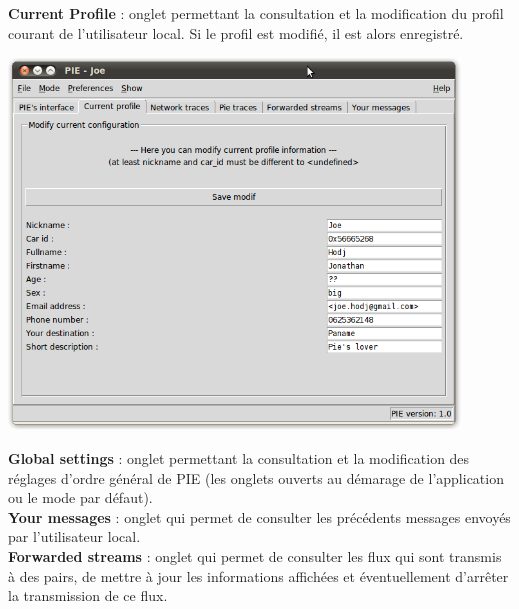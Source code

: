 \clearpage
\textbf{Current Profile} : onglet permettant la consultation et la modification du profil
courant de l'utilisateur local. Si le profil est modifié, il est alors enregistré. \\

\begin{center}
    \includegraphics[width=0.9\textwidth]{img/profile.png}
\end{center}

\textbf{Global settings} : onglet permettant la consultation et la modification des réglages 
d'ordre général de PIE (les onglets ouverts au démarage de l'application ou le mode par défaut). \\

\textbf{Your messages} : onglet qui permet de consulter les précédents messages envoyés par l'utilisateur local. \\

\textbf{Forwarded streams} : onglet qui permet de consulter les flux qui sont transmis à des pairs, de mettre à jour 
les informations affichées et éventuellement d'arrêter la transmission de ce flux.\\

